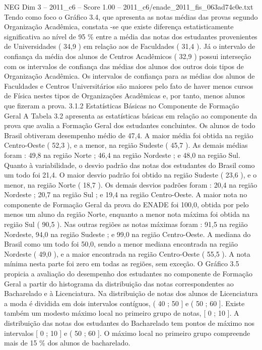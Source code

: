 \begin{textsample}{NEG Dim 3 – 2011\_c6 – Score 1.00 – 2011\_c6/enade\_2011\_fis\_063ad74c0e.txt}
Tendo como foco o Gráfico 3.4, que apresenta as notas médias das provas segundo Organização Acadêmica, constata -se que existe diferença estatisticamente significativa ao nível de 95 \% entre a média das notas dos estudantes provenientes de Universidades ( 34,9 ) em relação aos de Faculdades ( 31,4 ).
Já o intervalo de confiança da média dos alunos de Centros Acadêmicos ( 32,9 ) possui interseção com os intervalos de confiança das médias dos alunos dos outros dois tipos de Organização Acadêmica.
Os intervalos de confiança para as médias dos alunos de Faculdades e Centros Universitários são maiores pelo fato de haver menos cursos de Física nestes tipos de Organizações Acadêmicas e, por tanto, menos alunos que fizeram a prova. 3.1.2 Estatísticas Básicas no Componente de Formação Geral A Tabela 3.2 apresenta as estatísticas básicas em relação ao componente da prova que avalia a Formação Geral dos estudantes concluintes.
Os alunos de todo Brasil obtiveram desempenho médio de 47,4.
A maior média foi obtida na região Centro-Oeste ( 52,3 ), e a menor, na região Sudeste ( 45,7 ).
As demais médias foram : 49,8 na região Norte ; 46,4 na região Nordeste ; e 48,0 na região Sul.
Quanto à variabilidade, o desvio padrão das notas dos estudantes do Brasil como um todo foi 21,4.
O maior desvio padrão foi obtido na região Sudeste ( 23,6 ), e o menor, na região Norte ( 18,7 ).
Os demais desvios padrões foram : 20,4 na região Nordeste ; 20,7 na região Sul ; e 19,4 na região Centro-Oeste.
A maior nota no componente de Formação Geral da prova do ENADE foi 100,0, obtida por pelo menos um aluno da região Norte, enquanto a menor nota máxima foi obtida na região Sul ( 90,5 ).
Nas outras regiões as notas máximas foram : 91,5 na região Nordeste, 94,0 na região Sudeste ; e 99,0 na região Centro-Oeste.
A mediana do Brasil como um todo foi 50,0, sendo a menor mediana encontrada na região Nordeste ( 49,0 ), e a maior encontrada na região Centro-Oeste ( 55,5 ).
A nota mínima nesta parte foi zero em todas as regiões, sem exceção.
O Gráfico 3.5 propicia a avaliação do desempenho dos estudantes no componente de Formação Geral a partir do histograma da distribuição das notas correspondentes ao Bacharelado e à Licenciatura.
Na distribuição de notas dos alunos de Licenciatura a moda é dividida em dois intervalos contíguos, ( 40 ; 50 ] e ( 50 ; 60 ].
Existe também um modesto máximo local no primeiro grupo de notas, [ 0 ; 10 ].
A distribuição das notas dos estudantes do Bacharelado tem pontos de máximo nos intervalos [ 0 ; 10 ] e ( 50 ; 60 ].
O máximo local no primeiro grupo compreende mais de 15 \% dos alunos de bacharelado.

\end{textsample}

